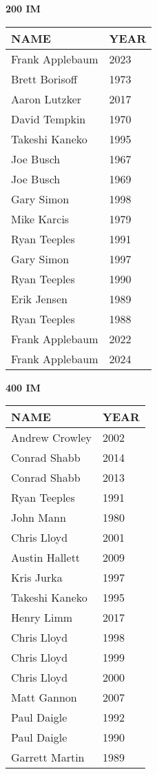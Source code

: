 \begin{table}[H]
\centering
\begin{minipage}[t]{0.48\textwidth}
\centering
\textbf{200 IM}\\[0.1cm]
\begin{tabular}{@{}p{2.8cm}p{1.2cm}@{}}
\hline
    \textbf{NAME} & \textbf{YEAR} \\
\hline
    Frank Applebaum & 2023 \\
    Brett Borisoff & 1973 \\
    Aaron Lutzker & 2017 \\
    David Tempkin & 1970 \\
    Takeshi Kaneko & 1995 \\
    Joe Busch & 1967 \\
    Joe Busch & 1969 \\
    Gary Simon & 1998 \\
    Mike Karcis & 1979 \\
    Ryan Teeples & 1991 \\
    Gary Simon & 1997 \\
    Ryan Teeples & 1990 \\
    Erik Jensen & 1989 \\
    Ryan Teeples & 1988 \\
    Frank Applebaum & 2022 \\
    Frank Applebaum & 2024 \\
\hline
\end{tabular}
\end{minipage}\hfill
\begin{minipage}[t]{0.48\textwidth}
\centering
\textbf{400 IM}\\[0.1cm]
\begin{tabular}{@{}p{2.8cm}p{1.2cm}@{}}
\hline
    \textbf{NAME} & \textbf{YEAR} \\
\hline
    Andrew Crowley & 2002 \\
    Conrad Shabb & 2014 \\
    Conrad Shabb & 2013 \\
    Ryan Teeples & 1991 \\
    John Mann & 1980 \\
    Chris Lloyd & 2001 \\
    Austin Hallett & 2009 \\
    Kris Jurka & 1997 \\
    Takeshi Kaneko & 1995 \\
    Henry Limm & 2017 \\
    Chris Lloyd & 1998 \\
    Chris Lloyd & 1999 \\
    Chris Lloyd & 2000 \\
    Matt Gannon & 2007 \\
    Paul Daigle & 1992 \\
    Paul Daigle & 1990 \\
    Garrett Martin & 1989 \\
\hline
\end{tabular}
\end{minipage}
\end{table}

